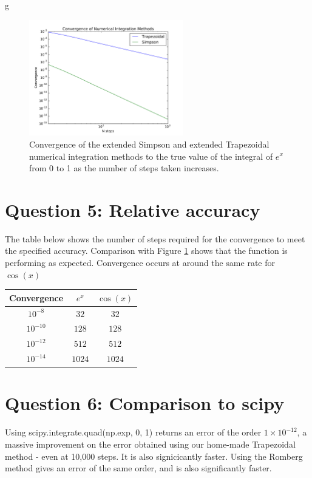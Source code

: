 g\documentclass{article}
\begin{document}
\begin{figure}[h]
\centering
\includegraphics[width=0.6\textwidth]{images/err_convergence.pdf}
\caption{Convergence of the extended Simpson and extended Trapezoidal numerical integration methods to the true value of the integral of $e^x$ from 0 to 1 as the number of steps taken increases.}
\label{fig:convergence}
\end{figure}

\section*{Question 5: Relative accuracy}

The table below shows the number of steps required for the convergence to meet the specified accuracy. Comparison with Figure \ref{fig:convergence} shows that the function is performing as expected. Convergence occurs at around the same rate for $\cos(x)$

\begin{center}
\begin{tabular}{ |c||c|c| } 
 \hline
 Convergence & $e^x$ & $\cos(x)$ \\ 
 \hline
 $10^{-8}$   & $32$   & $32$  \\ 
 $10^{-10}$  & $128$  & $128$ \\
 $10^{-12}$  & $512$  & $512$ \\
 $10^{-14}$  & $1024$ & $1024$\\ 
 \hline
\end{tabular}
\end{center}

\section*{Question 6: Comparison to scipy}

Using scipy.integrate.quad(np.exp, 0, 1) returns an error of the order $1\times10^{-12}$, a massive improvement on the error obtained using our home-made Trapezoidal method - even at 10,000 steps. It is also signicicantly faster. Using the Romberg method gives an error of the same order, and is also significantly faster.
\end{document}

